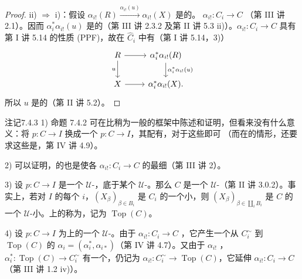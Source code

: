 \begin{proof}
ii) $\Rightarrow$ i)：假设 $\alpha_{i!}(R)\xrightarrow{\alpha_{i!}(u)}\alpha_{i!}(X)$ 是的。 $\alpha_{i!}:C_i\to C$ （第 III 讲 2.1）。因而 $\alpha_i^*\alpha_{i!}(u)$ 是的（第 III 讲 2.3.2 及第 II 讲 5.3 ii)）。$\alpha_{i!}:C_i\to C$ 具有第 I 讲 5.14 的性质 (PPF)，故在 $\widehat C_i$ 中有（第 I 讲 5.14，3)）
\[\begin{tikzcd}
R\arrow[r]\arrow[d,"u"']&\alpha_i^*\alpha_{i!}(R)\arrow[d,"\alpha_i^*\alpha_{i!}(u)"]\\
X\arrow[r]&\alpha_i^*\alpha_{i!}(X).
\end{tikzcd}\]
所以 $u$ 是的（第 II 讲 5.2）。
\end{proof}
\begin{SGAresult}{注记}{7.4.3}
1) 命题 7.4.2 可在比稍为一般的框架中陈述和证明，但看来没有什么意义：将 $p:C\to I$ 换成一个 $p:C\to I$，其配有，对于这些即可
（而在的情形，还要求这些是，第 IV 讲 4.9）。

2) 可以证明，的也是使各 $\alpha_{i!}:C_i\to C$ 的最细（第 III 讲 2）。

3) 设 $p:C\to I$ 是一个 $\mathcal U$-，底于某个 $\mathcal U$-。那么 $C$ 是一个 $\mathcal U$-（第 II 讲 3.0.2）。事实上，若对 $I$ 的每个 $i$，$(X_\beta)_{\beta\in B_i}$ 是 $C_i$ 的一个小，则 $(X_\beta)_{\beta\in\coprod_iB_i}$ 是 $C$ 的一个 $\mathcal U$-小。上的称为，记为 $\operatorname{Top}(C)$。

4) 设 $p:C\to I$ 为上的一个 $\mathcal U$-。由于 $\alpha_{i!}:C_i\to C$ ，它产生一个从 $C_i^\sim$ 到 $\operatorname{Top}(C)$ 的 $\alpha_i=(\alpha_i^*,\alpha_{i*})$（第 IV 讲 4.7）。又由于 $\alpha_{i!}$ ， $\alpha_i^*:\operatorname{Top}(C)\to C_i^\sim$ 有一个，仍记为 $\alpha_{i!}:C_i^\sim\to\operatorname{Top}(C)$，它延伸 $\alpha_{i!}:C_i\to C$（第 III 讲 1.2 iv)）。
\end{SGAresult}
